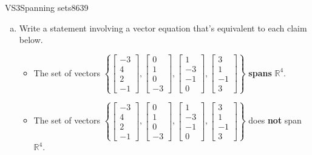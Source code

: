 \begin{exercise}{VS3}{Spanning sets}{8639} 
\begin{exerciseStatement} 

\begin{enumerate}[(a)]
\item  

 Write a statement involving a vector equation that's equivalent to each claim below. 

 

\begin{itemize}
\item  

 The set of vectors \(\left\{ \left[\begin{array}{c}
-3 \\
4 \\
2 \\
-1
\end{array}\right] , \left[\begin{array}{c}
0 \\
1 \\
0 \\
-3
\end{array}\right] , \left[\begin{array}{c}
1 \\
-3 \\
-1 \\
0
\end{array}\right] , \left[\begin{array}{c}
3 \\
1 \\
-1 \\
3
\end{array}\right] \right\}\) \textbf{spans} \(\mathbb R^4\). 

 
\item  

 The set of vectors \(\left\{ \left[\begin{array}{c}
-3 \\
4 \\
2 \\
-1
\end{array}\right] , \left[\begin{array}{c}
0 \\
1 \\
0 \\
-3
\end{array}\right] , \left[\begin{array}{c}
1 \\
-3 \\
-1 \\
0
\end{array}\right] , \left[\begin{array}{c}
3 \\
1 \\
-1 \\
3
\end{array}\right] \right\}\) does \textbf{not} span \(\mathbb R^4\). 


\end{itemize}
\end{enumerate}
\end{exerciseStatement}
\end{exercise}

